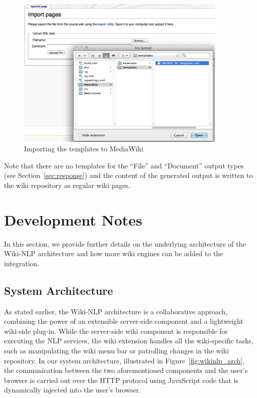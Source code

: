 \begin{figure}
\centering
\includegraphics[width=0.9\textwidth]{pictures/wiki_template_import.png}
\caption{Importing the \sa templates to MediaWiki}
\label{fig:wiki_template_import}
\end{figure}

Note that there are no templates for the ``File'' and ``Document'' output types (see Section~\ref{sec:response}) and the content of the generated output is written to the wiki repository as regular wiki pages.

\section{Development Notes}
In this section, we provide further details on the underlying architecture of the Wiki-NLP architecture and how more wiki engines can be added to the integration.

\subsection{System Architecture}
As stated earlier, the Wiki-NLP architecture is a collaborative approach, combining the power of an extensible server-side component and a lightweight wiki-side plug-in. While the server-side wiki component is responsible for executing the NLP services, the wiki extension handles all the wiki-specific tasks, such as manipulating the wiki menu bar or patrolling changes in the wiki repository. In our system architecture, illustrated in Figure~\ref{fig:wikinlp_arch}, the communication between the two aforementioned components and the user's browser is carried out over the HTTP protocol using JavaScript code that is dynamically injected into the user's browser.

